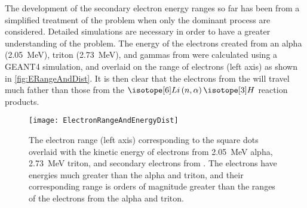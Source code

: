 The development of the secondary electron energy ranges so far has been from a simplified treatment of the problem when only the dominant process are considered.
Detailed simulations are necessary in order to have a greater understanding of the problem. 
The energy of the electrons created from an alpha (\SI{2.05}{\MeV}), triton (\SI{2.73}{\MeV}), and gammas from  were calculated using a GEANT4 simulation, and overlaid on the range of electrons (left axis) as shown in \autoref{fig:ERangeAndDist}.
It is then clear that the electrons from the  will travel much father than those from the $\iso[6]{Li}\left(n,\alpha\right)\iso[3]{H}$ reaction products.
\begin{figure}
  \centering
  \texttt{[image: ElectronRangeAndEnergyDist]}
  \caption[Electron Range and Energy Distribution of Selected Reactions]{The electron range (left axis) corresponding to the square dots overlaid with the kinetic energy of electrons from \SI{2.05}{\MeV} alpha, \SI{2.73}{\MeV} triton, and secondary electrons from . The  electrons have energies much greater than the alpha and triton, and their corresponding range is orders of magnitude greater than the ranges of the electrons from the alpha and triton. \rangeSimGeo}
  \label{fig:ERangeAndDist}
\end{figure}
